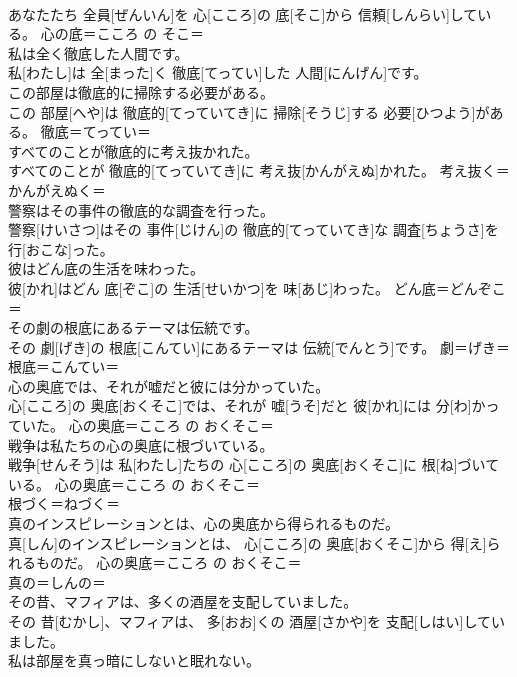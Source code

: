 \documentclass[8pt]{extreport}
\begin{document}
\begin{CJK}{UTF8}{min}
\\	あなたたち 全員[ぜんいん]を 心[こころ]の 底[そこ]から 信頼[しんらい]している。	心の底＝こころ の そこ＝ 
\\	私は全く徹底した人間です。	
\\	私[わたし]は 全[まった]く 徹底[てってい]した 人間[にんげん]です。	
\\	この部屋は徹底的に掃除する必要がある。	
\\	この 部屋[へや]は 徹底的[てっていてき]に 掃除[そうじ]する 必要[ひつよう]がある。	徹底＝てってい＝ 
\\	すべてのことが徹底的に考え抜かれた。	
\\	すべてのことが 徹底的[てっていてき]に 考え抜[かんがえぬ]かれた。	考え抜く＝かんがえぬく＝ 
\\	警察はその事件の徹底的な調査を行った。	
\\	警察[けいさつ]はその 事件[じけん]の 徹底的[てっていてき]な 調査[ちょうさ]を 行[おこな]った。	
\\	彼はどん底の生活を味わった。	
\\	彼[かれ]はどん 底[ぞこ]の 生活[せいかつ]を 味[あじ]わった。	どん底＝どんぞこ＝ 
\\	その劇の根底にあるテーマは伝統です。	
\\	その 劇[げき]の 根底[こんてい]にあるテーマは 伝統[でんとう]です。	劇＝げき＝ 
\\	根底＝こんてい＝ 
\\	心の奥底では、それが嘘だと彼には分かっていた。	
\\	心[こころ]の 奥底[おくそこ]では、それが 嘘[うそ]だと 彼[かれ]には 分[わ]かっていた。	心の奥底＝こころ の おくそこ＝ 
\\	戦争は私たちの心の奥底に根づいている。	
\\	戦争[せんそう]は 私[わたし]たちの 心[こころ]の 奥底[おくそこ]に 根[ね]づいている。	心の奥底＝こころ の おくそこ＝ 
\\	根づく＝ねづく＝ 
\\	真のインスピレーションとは、心の奥底から得られるものだ。	
\\	真[しん]のインスピレーションとは、 心[こころ]の 奥底[おくそこ]から 得[え]られるものだ。	心の奥底＝こころ の おくそこ＝ 
\\	真の＝しんの＝ 
\\	その昔、マフィアは、多くの酒屋を支配していました。	
\\	その 昔[むかし]、マフィアは、 多[おお]くの 酒屋[さかや]を 支配[しはい]していました。	
\\	私は部屋を真っ暗にしないと眠れない。	

\end{CJK}
\end{document}
